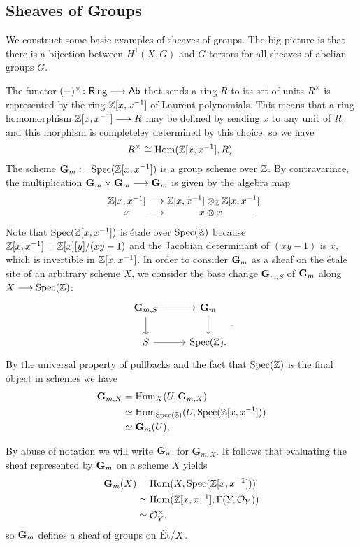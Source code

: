 \subsection{Sheaves of Groups}
We construct some basic examples of sheaves of groups. The big picture is that there is a bijection between $H^1(X,G)$ and $G$-torsors for all sheaves of abelian groups $G$.

\begin{example}
	The functor $(-)^\times\colon \mathsf{Ring} \longrightarrow \mathsf{Ab}$ that sends a ring $R$ to its set of units $R^\times$ is represented by the ring $\mathbb{Z}[x,x^{-1}]$ of Laurent polynomials. This means that a ring homomorphism $\mathbb{Z}[x,x^{-1}] \longrightarrow R$ may be defined by sending $x$ to any unit of $R$, and this morphism is completeley determined by this choice, so we have
	\[
		R^\times \cong \operatorname{Hom}(\mathbb{Z}[x,x^{-1}], R).
	\]
	The scheme $\mathbf{G}_m \coloneqq \operatorname{Spec}(\mathbb{Z}[x, x^{-1}])$ is a group scheme over $\mathbb{Z}$. By contravarince, the multiplication $\mathbf{G}_m \times \mathbf{G}_m \longrightarrow \mathbf{G}_m$ is given by the algebra map
	\[
		\begin{array}{c @{{}\to{}} c @{{}{}} c}
			\Z[x,x^{-1}] & \centermathcell{\Z[x,x^{-1}]\otimes_\Z \Z[x,x^{-1}]} \\
			x            & \centermathcell{\, x\otimes x}.
		\end{array}
	\]
	Note that $\operatorname{Spec}(\mathbb{Z}[x,x^{-1}])$ is \'etale over $\operatorname{Spec}(\mathbb{Z})$ because $\mathbb{Z}[x,x^{-1}] = \mathbb{Z}[x][y]/(xy-1)$ and the Jacobian determinant of $(xy-1)$ is $x$, which is invertible in $\mathbb{Z}[x,x^{-1}]$. In order to consider $\mathbf{G}_m$ as a sheaf on the \'etale site of an arbitrary scheme $X$, we consider the base change $\mathbf{G}_{m,S}$ of $\mathbf{G}_m$ along $X \longrightarrow \operatorname{Spec}(\mathbb{Z})$:
	\[
		\begin{tikzcd}
			{\mathbf{G}_{m,S}} & \Gm \\
			S & {\Spec(\Z)}.
			\arrow[from=1-1, to=1-2]
			\arrow[from=1-2, to=2-2]
			\arrow[from=2-1, to=2-2]
			\arrow[from=1-1, to=2-1]
		\end{tikzcd}.
	\]
	By the universal property of pullbacks and the fact that $\operatorname{Spec}(\mathbb{Z})$ is the final object in schemes we have
	\begin{align*}
		\mathbf{G}_{m,X} & = \operatorname{Hom}_X(U, \mathbf{G}_{m,X})                   \\
		                 & \simeq \operatorname{Hom}_{\operatorname{Spec}(\mathbb{Z})}(U, \operatorname{Spec}(\mathbb{Z}[x,x^{-1}])) \\
		                 & \simeq \mathbf{G}_m(U),
	\end{align*}

	By abuse of notation we will write $\mathbf{G}_m$ for $\mathbf{G}_{m,X}$. It follows that evaluating the sheaf represented by $\mathbf{G}_m$ on a scheme $X$ yields
	\begin{align*}
		\mathbf{G}_m(X) & = \operatorname{Hom}(X, \operatorname{Spec}(\mathbb{Z}[x,x^{-1}]))                 \\
		       & \simeq \operatorname{Hom}(\mathbb{Z}[x,x^{-1}], \Gamma(Y, \mathcal{O}_Y)) \\
		       & \simeq \mathcal{O}_Y^\times.
	\end{align*}
	so $\mathbf{G}_m$ defines a sheaf of groups on $\text{\'Et}/X$.
\end{example}

